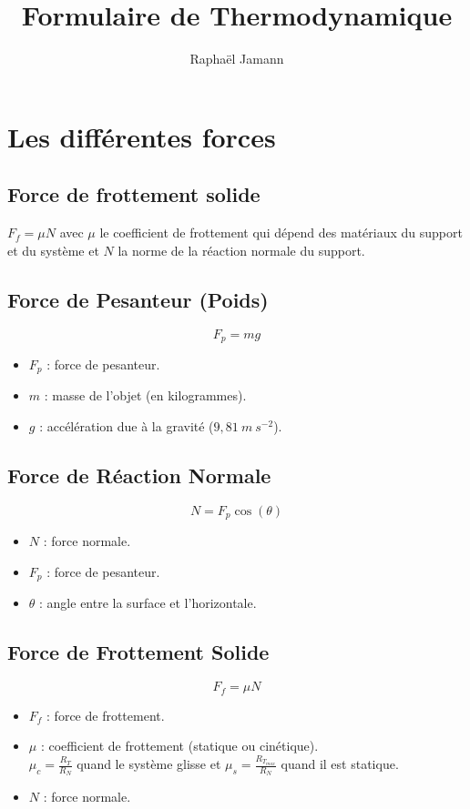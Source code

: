 \documentclass[a4paper,12pt]{article}
\title{Formulaire de Thermodynamique}
\author{Raphaël Jamann}
\date{}
\begin{document}
    \maketitle

    \section{Les différentes forces}

        \subsection{Force de frottement solide}

            $F_f = \mu N$ \quad avec $\mu$ le coefficient de frottement qui dépend des matériaux du support et du système et $N$ la norme de la réaction normale du support.

        \subsection{Force de Pesanteur (Poids)}
            $$ F_p = m g $$
            \begin{itemize}[label=$\bullet$]
                \item $F_p$ : force de pesanteur.
                \item $m$ : masse de l'objet (en kilogrammes).
                \item $g$ : accélération due à la gravité ($9,81 \ m \ s^{-2}$).
            \end{itemize}
            
        \subsection{Force de Réaction Normale}
                $$ N = F_p \cos(\theta) $$
            \begin{itemize}[label=$\bullet$]
                \item $N$ : force normale.
                \item $F_p$ : force de pesanteur.
                \item $\theta$ : angle entre la surface et l'horizontale.
            \end{itemize}
            
        \subsection{Force de Frottement Solide}
                $$ F_f = \mu N $$
            \begin{itemize}[label=$\bullet$]
                \item $F_f$ : force de frottement.
                \item $\mu$ : coefficient de frottement (statique ou cinétique).\\
                $\mu_c=\frac{R_T}{R_N}$ quand le système glisse et $\mu_s=\frac{R_{T_{max}}}{R_N}$ quand il est statique.
                \item $N$ : force normale.
            \end{itemize}
            
\end{document}
